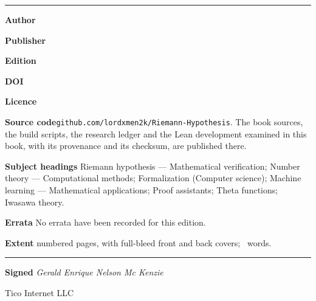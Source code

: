 \clearpage
\thispagestyle{empty}
\vspace*{1.0in}
\begin{center}
\begin{minipage}{0.92\textwidth}
{\sffamily\fontsize{15}{18}\selectfont\bfseries\color{txt} \bookTitle\par}
\vspace{4pt}
{\sffamily\small\color{txtdim} \bookSubtitle\par}
\vspace{18pt}
{\color{accent}\rule{\textwidth}{1.6pt}}\par
\vspace{14pt}
{\small\color{txt}
\noindent\textbf{Author}\quad \bookAuthor\par
\vspace{4pt}
\noindent\textbf{Publisher}\quad \bookImprint\par
\vspace{4pt}
\noindent\textbf{Edition}\quad \bookEdition\par
\vspace{4pt}
\noindent\textbf{DOI}\quad \href{https://doi.org/\bookDOI}{\texttt{\bookDOI}}\par
\vspace{4pt}
\noindent\textbf{Licence}\quad \bookLicense\par
\vspace{4pt}
\noindent\textbf{Source code}\quad \texttt{github.com/lordxmen2k/Riemann-Hypothesis}.
The book sources, the build scripts, the research ledger and the Lean
development examined in this book, with its provenance and its checksum, are
published there.\par
\vspace{14pt}
\noindent\textbf{Subject headings}\quad
Riemann hypothesis --- Mathematical verification; Number theory ---
Computational methods; Formalization (Computer science); Machine learning ---
Mathematical applications; Proof assistants; Theta functions; Iwasawa theory.\par
\vspace{14pt}
\noindent\textbf{Errata}\quad
No errata have been recorded for this edition.\par
\vspace{14pt}
\noindent\textbf{Extent}\quad
\bookPages{} numbered pages, with full-bleed front and back
covers;\ \bookWords{} words.\par
\vspace{14pt}
\noindent\rule{\textwidth}{0.4pt}\par
\vspace{10pt}
\noindent\textbf{Signed}\quad
\emph{Gerald Enrique Nelson Mc Kenzie}\par
\vspace{4pt}
\noindent Tico Internet LLC\par
\vspace{4pt}
\noindent \bookFactsDate\par
}
\end{minipage}
\end{center}
